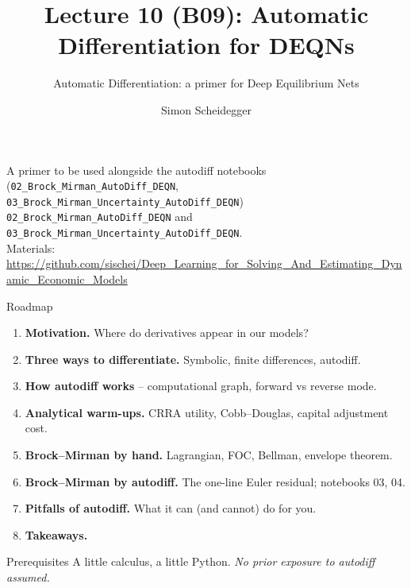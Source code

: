 \documentclass[aspectratio=169,11pt]{beamer}
\title[Lecture 10 (B09)]{Lecture 10 (B09): Automatic Differentiation for DEQNs}
\subtitle{Automatic Differentiation: a primer for Deep Equilibrium Nets}
\author{Simon Scheidegger}
\institute{HEC, University of Lausanne}
\date{}
\begin{document}

{
\begin{frame}
\titlepage
\vspace{-0.4cm}
\begin{center}
{\footnotesize A primer to be used alongside the autodiff notebooks (\texttt{02\_Brock\_Mirman\_AutoDiff\_DEQN}, \texttt{03\_Brock\_Mirman\_Uncertainty\_AutoDiff\_DEQN})\\
\texttt{02\_Brock\_Mirman\_AutoDiff\_DEQN} and \texttt{03\_Brock\_Mirman\_Uncertainty\_AutoDiff\_DEQN}.}\\[4pt]
{\footnotesize Materials: \url{https://github.com/sischei/Deep_Learning_for_Solving_And_Estimating_Dynamic_Economic_Models}}
\end{center}
\end{frame}
}

\begin{frame}{Roadmap}
\begin{enumerate}\itemsep4pt
  \item \textbf{Motivation.} Where do derivatives appear in our models?
  \item \textbf{Three ways to differentiate.} Symbolic, finite differences, autodiff.
  \item \textbf{How autodiff works} -- computational graph, forward vs reverse mode.
  \item \textbf{Analytical warm-ups.} CRRA utility, Cobb--Douglas, capital adjustment cost.
  \item \textbf{Brock--Mirman by hand.} Lagrangian, FOC, Bellman, envelope theorem.
  \item \textbf{Brock--Mirman by autodiff.} The one-line Euler residual; notebooks 03, 04.
  \item \textbf{Pitfalls of autodiff.} What it can (and cannot) do for you.
  \item \textbf{Takeaways.}
\end{enumerate}
\vspace{6pt}
\begin{block}{Prerequisites}
\small
A little calculus, a little Python. \emph{No prior exposure to autodiff assumed.}
\end{block}
\end{frame}

\end{document}
